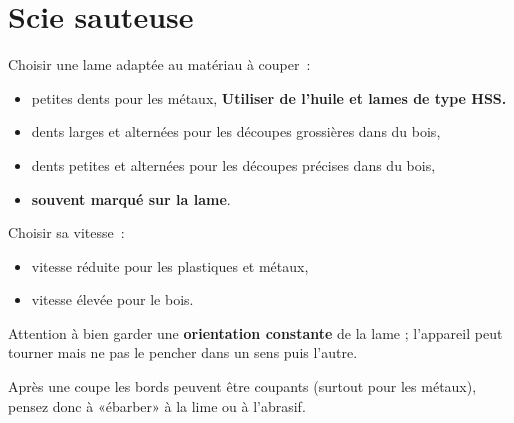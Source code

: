 \section{Scie sauteuse} %
Choisir une lame adaptée au matériau à couper~:
\begin{itemize}
\item petites dents pour les métaux, \textbf{Utiliser de l'huile et lames de type HSS.}
\item dents larges et alternées pour les découpes grossières dans du bois,
\item dents petites et alternées pour les découpes précises dans du bois,
\item \textbf{souvent marqué sur la lame}.
\end{itemize}

Choisir sa vitesse~:
\begin{itemize}
\item vitesse réduite pour les plastiques et métaux,
\item vitesse élevée pour le bois.
\end{itemize}

Attention à bien garder une \textbf{orientation constante} de la lame ; l'appareil peut tourner mais ne pas le pencher dans un sens puis l'autre.

Après une coupe les bords peuvent être coupants (surtout pour les métaux), pensez donc à «ébarber» à la lime ou à l'abrasif.
